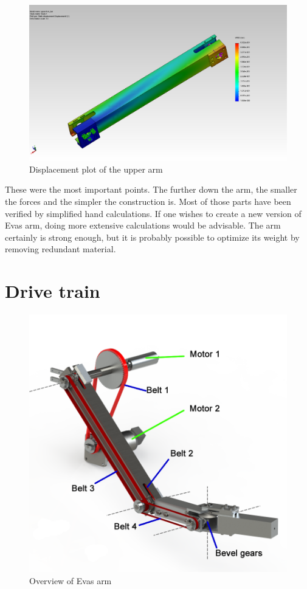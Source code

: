 \documentclass[technical_document.tex]{subfiles}
\begin{document}
\begin{figure}[ht!]
	\centering
	\mbox{\includegraphics[scale=0.3]{Images/upperArm_bar_displace.jpg}}
	\caption{Displacement plot of the upper arm}
	\label{fig:upperArm_displace}
\end{figure}

These were the most important points. The further down the arm, the smaller the forces and the simpler the construction is. Most of those parts have been verified by simplified hand calculations. If one wishes to create a new version of Eva\textquotesingle{}s arm, doing more extensive calculations would be advisable. The arm certainly is strong enough, but it is probably possible to optimize its weight by removing redundant material.

\section{Drive train}

\begin{figure}[ht!]
	\centering
	\mbox{\includegraphics[scale=1.0]{Images/overview_legenda.png}}
	\caption{Overview of Eva\textquotesingle{}s arm}
	\label{fig:overviewLegenda}
\end{figure}
\end{document}
